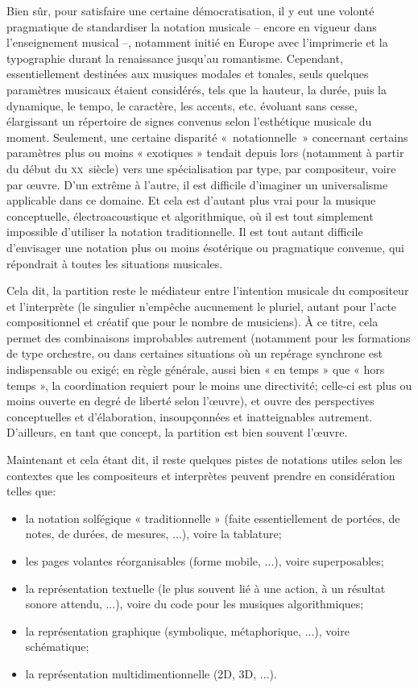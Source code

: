 \documentclass{article}
\begin{document}
Bien sûr, pour satisfaire une certaine démocratisation, il y eut une volonté pragmatique de standardiser la notation musicale -- encore en vigueur dans l'enseignement musical --, notamment initié en Europe avec l'imprimerie et la typographie durant la renaissance jusqu'au romantisme. Cependant, essentiellement destinées aux musiques modales et tonales, seuls quelques paramètres musicaux étaient considérés, tels que la hauteur, la durée, puis la dynamique, le tempo, le caractère, les accents, etc. évoluant sans cesse, élargissant un répertoire de signes convenus selon l'esthétique musicale du moment.  
Seulement, une certaine disparité \hbox{« no}tationnel\hbox{le »} concernant certains paramètres plus ou moins « exotiques » tendait depuis lors (notamment à partir du début du  \textsc{xx}\ieme ~siècle) vers une  spécialisation par type, par compositeur, voire par œuvre.
D'un extrême à l'autre, il est difficile d'imaginer un universalisme applicable dans ce domaine. Et cela est d'autant plus vrai pour la musique conceptuelle, électroacoustique et algorithmique, où il est tout simplement impossible d'utiliser la notation traditionnelle. Il est tout autant difficile d'envisager une notation plus ou moins ésotérique ou pragmatique convenue, qui répondrait à toutes les situations musicales.

Cela dit, la partition reste le médiateur entre l'intention musicale du compositeur et l'interprète (le singulier n'empêche aucunement le pluriel, autant pour l'acte compositionnel et créatif que pour le nombre de musiciens). À ce titre, cela permet des combinaisons improbables autrement (notamment pour les formations de type orchestre, ou dans certaines situations où un repérage synchrone est indispensable ou exigé; en règle générale, aussi bien « en temps » que « hors temps », la coordination requiert pour le moins une directivité; celle-ci est plus ou moins ouverte en degré de liberté selon l'œuvre), et ouvre des perspectives conceptuelles et d'élaboration, insoupçonnées et inatteignables autrement. D'ailleurs, en tant que concept, la partition est bien souvent l'œuvre.  

\bigskip

Maintenant et cela étant dit, il reste quelques pistes de notations utiles selon les contextes que les compositeurs et interprètes peuvent prendre en considération telles que:

\begin{itemize}
\item la notation solfégique « traditionnelle » (faite essentiellement de portées, de notes, de durées, de mesures, ...), voire la tablature;
\item les pages volantes réorganisables  (forme mobile, ...), voire superposables;
\item la représentation textuelle (le plus souvent lié à une action, à un résultat sonore attendu, ...), voire du code pour les musiques algorithmiques;
\item la représentation graphique (symbolique, métaphorique, ...), voire schématique;
\item la représentation multidimentionnelle (2D, 3D, ...).
\end{itemize}
\end{document}
